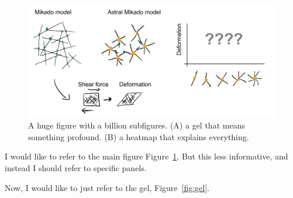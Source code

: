 \documentclass[onecolumn,11pt]{article}
\begin{document}








\clearpage




\begin{figure}[ht]
        \centering
        \includegraphics[width=4.5in]{figures/figJeanJacket.pdf}


        \caption{A huge figure with a billion subfigures. 
        (A) a gel that means something profound. 
        (B) a heatmap that explains everything.}
        \label{fig:main_conclusion}
\end{figure}
    

I would like to refer to the main figure Figure~\ref{fig:main_conclusion}. But this less informative, and instead I should refer to specific panels.

Now, I would like to just refer to the gel, Figure~\ref{fig:gel}.
\end{document}
